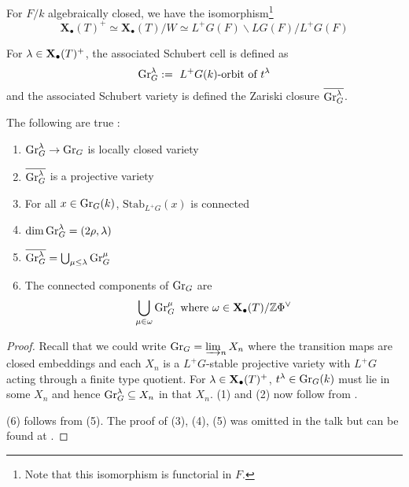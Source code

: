 \documentclass{article}
\begin{document}
\begin{prop}

  For $F / k$ algebraically closed,
  we have the isomorphism\footnote{
    Note that this isomorphism is functorial in $F$.
  }
  \[
    \mathbf{X}_\bullet(T)^+ \simeq 
    \mathbf{X}_\bullet(T) / W \simeq L^+G(F) \backslash LG(F) / L^+G(F)
  \]
\end{prop}

\begin{dfn}
  
  For $\lambda \in \mathbf{X}_\bullet(T)^+$,
  the associated Schubert cell is defined as 
  \[
    \operatorname{Gr}_G^\lambda := \text{ $L^+G(k)$-orbit of $t^\lambda$}
  \]
  and the associated Schubert variety is defined the Zariski closure 
  $\overline{\operatorname{Gr}_G^\lambda}$.
\end{dfn}

\begin{prop}

  The following are true :
  \begin{enumerate}
    \item $\operatorname{Gr}_G^\lambda \to \operatorname{Gr}_G$ is locally closed variety
    \item $\overline{\operatorname{Gr}_G^\lambda}$ is a projective variety
    \item For all $x \in \operatorname{Gr}_G(k)$, $\mathrm{Stab}_{L^+G}(x)$ is connected
    \item $\dim \operatorname{Gr}_G^\lambda = (2\rho , \lambda)$ 
    \item $\overline{\operatorname{Gr}_G^\lambda} = \bigcup_{\mu \leq \lambda} \operatorname{Gr}_G^\mu$
    \item The connected components of $\operatorname{Gr}_G$ are 
    \[
      \bigcup_{\mu \in \omega} \operatorname{Gr}_G^\mu
      \text{ where $\omega \in \mathbf{X}_\bullet(T) / \mathbb{Z}\Phi^\vee$}
    \]
  \end{enumerate}
\end{prop}
\begin{proof}
  
  Recall that we could write $\operatorname{Gr}_G = \varinjlim_{n} X_n$ where
  the transition maps are closed embeddings and
  each $X_n$ is a $L^+G$-stable projective variety with
  $L^+G$ acting through a finite type quotient.
  For $\lambda \in \mathbf{X}_\bullet(T)^+$,
  $t^\lambda \in \operatorname{Gr}_G(k)$ must lie in some $X_n$
  and hence $\operatorname{Gr}_G^\lambda \subseteq X_n$ in that $X_n$.
  (1) and (2) now follow from \cite[Prop. 9.4]{milne}.

  (6) follows from (5).
  The proof of (3), (4), (5) was omitted in the talk
  but can be found at \cite[Prop. 2.1.5]{Zhu-16}.

\end{proof}
\end{document}
